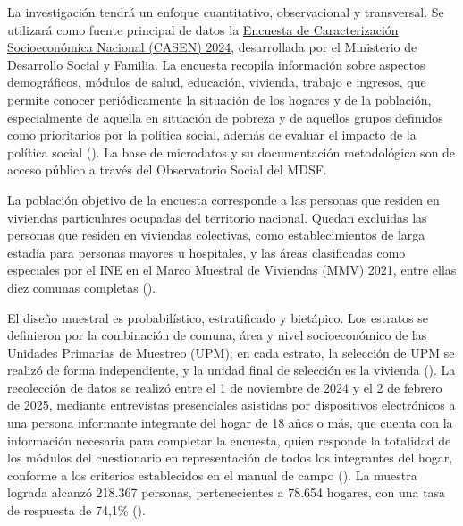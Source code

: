 \documentclass[
  spanish,
  a4paper,
  oneside]{scrbook}
\begin{document}
La investigación tendrá un enfoque cuantitativo, observacional y
transversal. Se utilizará como fuente principal de datos la
\href{https://observatorio.ministeriodesarrollosocial.gob.cl/encuesta-casen-2024}{Encuesta
de Caracterización Socioeconómica Nacional (CASEN) 2024}, desarrollada
por el Ministerio de Desarrollo Social y Familia. La encuesta recopila
información sobre aspectos demográficos, módulos de salud, educación,
vivienda, trabajo e ingresos, que permite conocer periódicamente la
situación de los hogares y de la población, especialmente de aquella en
situación de pobreza y de aquellos grupos definidos como prioritarios
por la política social, además de evaluar el impacto de la política
social (). La base de microdatos y su documentación metodológica
son de acceso público a través del Observatorio Social del MDSF.

La población objetivo de la encuesta corresponde a las personas que
residen en viviendas particulares ocupadas del territorio nacional.
Quedan excluidas las personas que residen en viviendas colectivas, como
establecimientos de larga estadía para personas mayores u hospitales, y
las áreas clasificadas como especiales por el INE en el Marco Muestral
de Viviendas (MMV) 2021, entre ellas diez comunas completas
().

El diseño muestral es probabilístico, estratificado y bietápico. Los
estratos se definieron por la combinación de comuna, área y nivel
socioeconómico de las Unidades Primarias de Muestreo (UPM); en cada
estrato, la selección de UPM se realizó de forma independiente, y la
unidad final de selección es la vivienda
(). La recolección de datos se realizó entre el 1 de
noviembre de 2024 y el 2 de febrero de 2025, mediante entrevistas
presenciales asistidas por dispositivos electrónicos a una persona
informante integrante del hogar de 18 años o más, que cuenta con la
información necesaria para completar la encuesta, quien responde la
totalidad de los módulos del cuestionario en representación de todos los
integrantes del hogar, conforme a los criterios establecidos en el
manual de campo (). La muestra lograda
alcanzó 218.367 personas, pertenecientes a 78.654 hogares, con una tasa
de respuesta de 74,1\% ().
\end{document}
